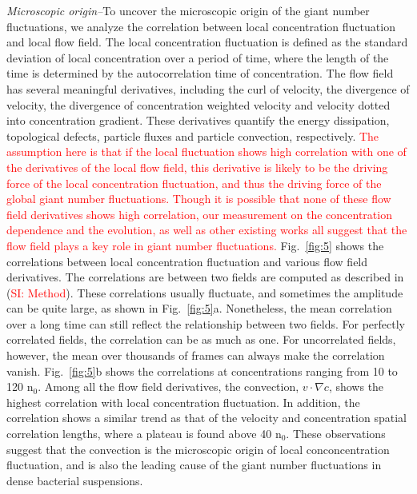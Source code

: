 \documentclass[twocolumn,aps,prl,amsmath,amssymb,longbibliography]{revtex4-1}
\begin{document}
\textit{Microscopic origin--}To uncover the microscopic origin of the giant number fluctuations, we analyze the correlation between local concentration fluctuation and local flow field. The local concentration fluctuation is defined as the standard deviation of local concentration over a period of time, where the length of the time is determined by the autocorrelation time of concentration. The flow field has several meaningful derivatives, including the curl of velocity, the divergence of velocity, the divergence of concentration weighted velocity and velocity dotted into concentration gradient. These derivatives quantify the energy dissipation, topological defects, particle fluxes and particle convection, respectively. \textcolor{red}{The assumption here is that if the local fluctuation shows high correlation with one of the derivatives of the local flow field, this derivative is likely to be the driving force of the local concentration fluctuation, and thus the driving force of the global giant number fluctuations. Though it is possible that none of these flow field derivatives shows high correlation, our measurement on the concentration dependence and the evolution, as well as other existing works \cite{PhysRevLett.100.178103, Schaller4488} all suggest that the flow field plays a key role in giant number fluctuations.} Fig.~\ref{fig:5} shows the correlations between local concentration fluctuation and various flow field derivatives. The correlations are between two fields are computed as described in (\textcolor{red}{SI: Method}). These correlations usually fluctuate, and sometimes the amplitude can be quite large, as shown in Fig.~\ref{fig:5}a. Nonetheless, the mean correlation over a long time can still reflect the relationship between two fields. For perfectly correlated fields, the correlation can be as much as one. For uncorrelated fields, however, the mean over thousands of frames can always make the correlation vanish.
Fig.~\ref{fig:5}b shows the correlations at concentrations ranging from 10 to 120 n$_0$.
Among all the flow field derivatives, the convection, $v\cdot\nabla c$, shows the highest correlation with local concentration fluctuation. In addition, the correlation shows a similar trend as that of the velocity and concentration spatial correlation lengths, where a plateau is found above 40 n$_0$. These observations suggest that the convection is the microscopic origin of local conconcentration fluctuation, and is also the leading cause of the giant number fluctuations in dense bacterial suspensions.
\end{document}
